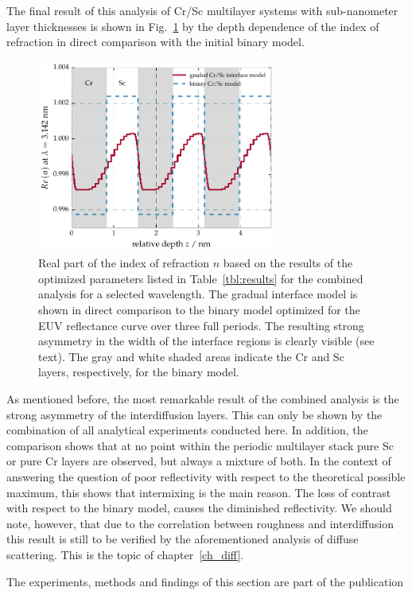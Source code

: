 The final result of this analysis of Cr/Sc multilayer systems with sub-nanometer layer thicknesses is shown in Fig.~\ref{ch_spec:fig_CrSc_electron_density_profile} by the depth dependence of the index of refraction in direct comparison with the initial binary model.
\begin{figure}[htbp]
  \centering
  \includegraphics[width=0.7\textwidth]{img/CrSc_binary_vs_fitted_gradual_model}
  \caption{Real part of the index of refraction $n$  based on the results of 
the optimized parameters listed in Table~\ref{tbl:results} for the combined 
analysis for a selected wavelength. The gradual interface model is shown in 
direct comparison to the binary model optimized for the EUV reflectance curve 
over three full periods. The resulting strong asymmetry in the width of the 
interface regions is clearly visible (see text). The gray and white shaded 
areas indicate the Cr and Sc layers, respectively, for the binary model.}
  \label{ch_spec:fig_CrSc_electron_density_profile}
\end{figure}
As mentioned before, the most remarkable result of the combined analysis is the strong asymmetry of the interdiffusion layers. This can only be shown by the combination of all 
analytical experiments conducted here. In addition, the comparison shows that at no point within the periodic multilayer stack pure Sc or pure Cr layers are observed, but always a mixture of both. In the context of answering the question of poor reflectivity with respect to the theoretical possible maximum, this shows that intermixing is the main reason. The loss of contrast with respect to the binary model, causes the diminished reflectivity. We should note, however, that due to the correlation between roughness and interdiffusion this result is still to be verified by the aforementioned analysis of diffuse scattering. This is the topic of chapter~\ref{ch_diff}.

The experiments, methods and findings of this section are part of the publication 


